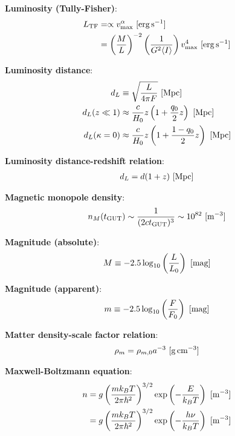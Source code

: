 \documentclass[a4paper,11pt]{article}
\begin{document}
{\noindent}\textbf{Luminosity (Tully-Fisher)}:
\begin{align*}
    L_\mathrm{TF} &= \propto v_\mathrm{max}^\alpha ~ [{\rm erg\,s^{-1}}] \\
    &= \left(\frac{M}{L}\right)^{-2} \left(\frac{1}{G^2\langle I\rangle}\right)v_\mathrm{max}^4 ~ [{\rm erg\,s^{-1}}]
\end{align*}

{\noindent}\textbf{Luminosity distance}:
\begin{align*}
    d_L &\equiv \sqrt{\frac{L}{4\pi F}} ~ [{\rm Mpc}] \\
    d_L(z\ll1) &\approx \frac{c}{H_0}z\left(1+\frac{q_0}{2}z\right) ~ [{\rm Mpc}] \\
    d_L(\kappa=0) &\approx \frac{c}{H_0}z \left(1+\frac{1-q_0}{2}z\right) ~ [{\rm Mpc}]
\end{align*}

{\noindent}\textbf{Luminosity distance-redshift relation}:
\begin{align*}
    d_L = d(1+z) ~ [{\rm Mpc}]
\end{align*}

{\noindent}\textbf{Magnetic monopole density}:
\begin{align*}
    n_M(t_\mathrm{GUT}) \sim \frac{1}{(2ct_\mathrm{GUT})^3} \sim 10^{82} ~ [{\rm m^{-3}}]
\end{align*}

{\noindent}\textbf{Magnitude (absolute)}:
\begin{align*}
    M \equiv -2.5\log_{10}\left(\frac{L}{L_0}\right) ~ [{\rm mag}]
\end{align*}

{\noindent}\textbf{Magnitude (apparent)}:
\begin{align*}
    m \equiv -2.5\log_{10}\left(\frac{F}{F_0}\right) ~ [{\rm mag}]
\end{align*}

{\noindent}\textbf{Matter density-scale factor relation}:
\begin{align*}
    \rho_m = \rho_{m,0}a^{-3} ~ [{\rm g\,cm^{-3}}]
\end{align*}

{\noindent}\textbf{Maxwell-Boltzmann equation}:
\begin{align*}
    n &= g\left(\frac{mk_BT}{2\pi\hbar^2}\right)^{3/2}\exp\left(-\frac{E}{k_BT}\right) ~ [{\rm m^{-3}}] \\
    &= g\left(\frac{mk_BT}{2\pi\hbar^2}\right)^{3/2}\exp\left(-\frac{h\nu}{k_BT}\right) ~ [{\rm m^{-3}}]
\end{align*}
\end{document}
